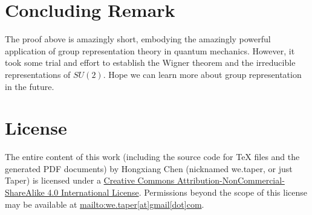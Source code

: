 \documentclass{article}
\begin{document}
\section{Concluding Remark}
\label{sec:Concluding-Remark}

The proof above is amazingly short, embodying the amazingly powerful application
of group representation theory in quantum mechanics. However, it took some trial
and effort to establish the Wigner theorem and the irreducible representations
of $SU(2)$. Hope we can learn more about group representation in the future.
\nocite{ma2007group}





\section{License}
The entire content of this work (including the source code
for TeX files and the generated PDF documents) by 
Hongxiang Chen (nicknamed we.taper, or just Taper) is
licensed under a 
\href{http://creativecommons.org/licenses/by-nc-sa/4.0/}{Creative 
Commons Attribution-NonCommercial-ShareAlike 4.0 International 
License}. Permissions beyond the scope of this 
license may be available at \url{mailto:we.taper[at]gmail[dot]com}.
\end{document}
